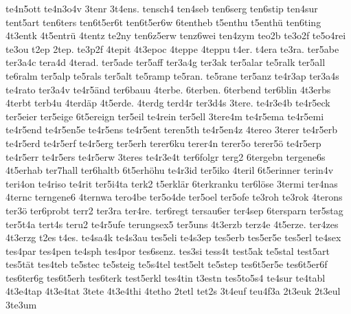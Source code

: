 {    te4n5ott
    te4n3o4v
    3tenr
    3t4ens.
    tensch4
    ten4seb
    ten6serg
    ten6stip
    ten4sur
    tent5art
    ten6ters
    ten6t5er6t
    ten6t5er6w
    6tentheb
    t5enthu
    t5enthü
    ten6ting
    4t3entk
    4t5entrü
    4tentz
    te2ny
    ten6z5erw
    tenz6wei
    ten4zym
    teo2b
    te3o2f
    te5o4rei
    te3ou
    t2ep
    2tep.
    te3p2f
    4tepit
    4t3epoc
    4teppe
    4teppu
    t4er.
    t4era
    te3ra.
    ter5abe
    ter3a4c
    tera4d
    4terad.
    ter5ade
    ter5aff
    ter3a4g
    ter3ak
    ter5alar
    te5ralk
    ter5all
    te6ralm
    ter5alp
    te5rals
    ter5alt
    te5ramp
    te5ran.
    te5rane
    ter5anz
    te4r3ap
    ter3a4s
    te4rato
    ter3a4v
    te4r5änd
    ter6bauu
    4terbe.
    6terben.
    6terbend
    ter6blin
    4t3erbs
    4terbt
    terb4u
    4terdäp
    4t5erde.
    4terdg
    terd4r
    ter3d4s
    3tere.
    te4r3e4b
    te4r5eck
    ter5eier
    ter5eige
    6t5ereign
    ter5eil
    te4rein
    ter5ell
    3tere4m
    te4r5ema
    te4r5emi
    te4r5end
    te4r5en5e
    te4r5ens
    te4r5ent
    teren5th
    te4r5en4z
    4tereo
    3terer
    te4r5erb
    te4r5erd
    te4r5erf
    te4r5erg
    ter5erh
    terer6ku
    terer4n
    terer5o
    terer5ö
    te4r5erp
    te4r5err
    te4r5ers
    te4r5erw
    3teres
    te4r3e4t
    ter6folgr
    terg2
    6tergebn
    tergene6s
    4t5erhab
    ter7hall
    ter6haltb
    6t5erhöhu
    te4r3id
    ter5iko
    4teril
    6t5erinner
    terin4v
    teri4on
    te4riso
    te4rit
    ter5i4ta
    terk2
    t5erklär
    6terkranku
    ter6löse
    3termi
    ter4nas
    4ternc
    terngene6
    4ternwa
    tero4be
    ter5o4de
    ter5oel
    ter5ofe
    te3roh
    te3rok
    4terons
    ter3ö
    ter6probt
    terr2
    ter3ra
    ter4re.
    ter6regt
    tersau6er
    ter4sep
    6tersparn
    ter5stag
    ter5t4a
    tert4s
    teru2
    te4r5ufe
    terungsex5
    ter5uns
    4t3erzb
    terz4e
    4t5erze.
    ter4zes
    4t3erzg
    t2es
    t4es.
    te4sa4k
    te4s3au
    tes5eli
    te4s3ep
    tes5erb
    tes5er5e
    tes5erl
    te4sex
    tes4par
    tes4pen
    te4sph
    tes4por
    tes6senz.
    tes3si
    tess4t
    test5ak
    te5stal
    test5art
    tes5tät
    tes4teb
    te5stec
    te5steig
    te5s4tel
    test5elt
    te5step
    tes6t5er5e
    tes6t5er6f
    tes6ter6g
    tes6t5erh
    tes6terk
    test5erkl
    tes4tin
    t3estn
    tes5to5s4
    te4sur
    te4tabl
    4t3e4tap
    4t3e4tat
    3tete
    4t3e4thi
    4tetho
    2tetl
    tet2s
    3t4euf
    teu4f3a
    2t3euk
    2t3eul
    3te3um
}
